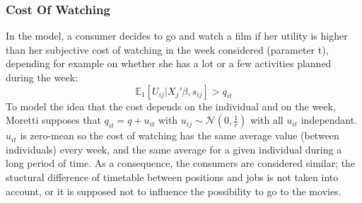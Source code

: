 \subsubsection{Cost Of Watching}
In the model, a consumer decides to go and watch a film if her utility is higher than her subjective cost of watching in the week considered (parameter t), depending for example on whether she has a lot or a few activities planned during the week: 
\begin{equation}
	\mathbb{E}_1[U_{i j}|X_{j}'\beta, s_{i j}]>q_{i t}
\end{equation}
To model the idea that the cost depends on the individual and on the week, Moretti supposes that $q_{i t}=q+u_{i t}$ with $u_{i j}\sim \mathcal{N}(0,\frac{1}{r})$ with all $u_{i t}$ independant. $u_{i t}$ is zero-mean so the cost of watching has the same average value (between individuals) every week, and the same average for a given individual during a long period of time. As a consequence, the consumers are considered similar; the stuctural difference of timetable between positions and jobs is not taken into account, or it is supposed not to influence the possibility to go to the movies.\\
\\
